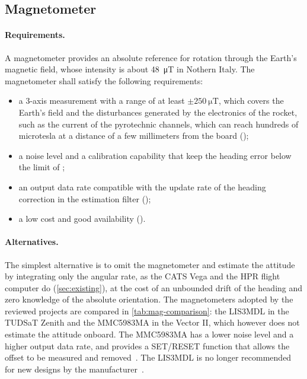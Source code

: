 \subsection{Magnetometer}
\label{sec:mag-choice}

\paragraph{Requirements.} A magnetometer provides an absolute reference for rotation through the Earth's magnetic field, whose intensity is about \SI{48}{\micro\tesla} in Nothern Italy. The magnetometer shall satisfy the following requirements:
\begin{itemize}
    \item a 3-axis measurement with a range of at least $\pm\SI{250}{\micro\tesla}$, which covers the Earth's field and the disturbances generated by the electronics of the rocket, such as the current of the pyrotechnic channels, which can reach hundreds of microtesla at a distance of a few millimeters from the board ();
    \item a noise level and a calibration capability that keep the heading error below the limit of ; 
    \item an output data rate compatible with the update rate of the heading correction in the estimation filter (); 
    \item a low cost and good availability ().
\end{itemize}

\paragraph{Alternatives.} The simplest alternative is to omit the magnetometer and estimate the attitude by integrating only the angular rate, as the CATS Vega and the HPR flight computer do (\cref{sec:existing}), at the cost of an unbounded drift of the heading and zero knowledge of the absolute orientation. The magnetometers adopted by the reviewed projects are compared in \cref{tab:mag-comparison}: the LIS3MDL in the TUDSaT Zenith and the MMC5983MA in the Vector II, which however does not estimate the attitude onboard. The MMC5983MA has a lower noise level and a higher output data rate, and provides a SET/RESET function that allows the offset to be measured and removed~\cite{mmc5983ma:datasheet}. The LIS3MDL is no longer recommended for new designs by the manufacturer~\cite{lis3mdl:page}.

